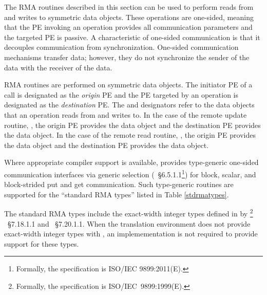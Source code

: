 The \ac{RMA} routines described in this section can be used to perform
reads from and writes to symmetric data objects. These operations
are one-sided, meaning that the \ac{PE} invoking an operation provides all
communication parameters and the targeted \ac{PE} is passive. A characteristic
of one-sided communication is that it decouples communication from
synchronization. One-sided communication mechanisms transfer data; however,
they do not synchronize the sender of the data with the receiver of the data.

\openshmem \ac{RMA} routines are performed on symmetric data objects.  The
initiator \ac{PE} of a call is designated as the \emph{origin} \ac{PE} and the
\ac{PE} targeted by an operation is designated as the \emph{destination} \ac{PE}.  The
\source{} and \dest{} designators refer to the data objects that an operation
reads from and writes to.  In the case of the remote update routine, \PUT{},
the origin \ac{PE} provides the \source{} data object and the destination
\ac{PE} provides the \dest{} data object. In the case of the remote read
routine, \GET{}, the origin \ac{PE} provides the \dest{} data object and the
destination \ac{PE} provides the \source{} data object.

Where appropriate compiler support is available, \openshmem provides type-generic 
one-sided communication interfaces via \Cstd[11] generic selection
(\Cstd[11]~\S6.5.1.1\footnote{Formally, the \Cstd[11] specification is ISO/IEC 9899:2011(E).})
for block, scalar, and block-strided put and get communication. 
Such type-generic routines are supported for the ``standard \ac{RMA} types''
listed in Table \ref{stdrmatypes}.

The standard \ac{RMA} types include the exact-width integer types defined in
 by \Cstd[99]%
\footnote{Formally, the \Cstd[99] specification is ISO/IEC~9899:1999(E).}%
~\S7.18.1.1 and \Cstd[11]~\S7.20.1.1. When the \Cstd translation environment
does not provide exact-width integer types with , an
\openshmem implemementation is not required to provide support for these types.

